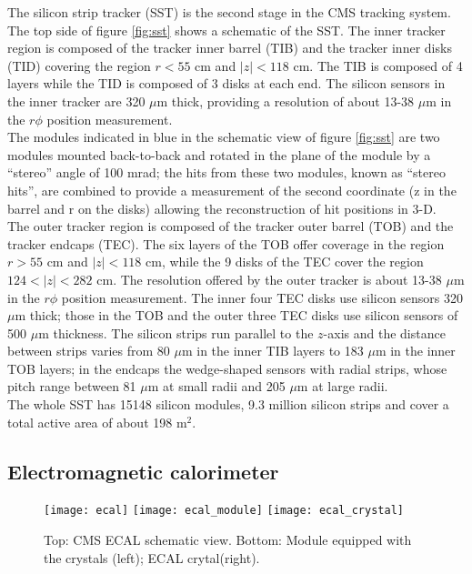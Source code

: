 \noindent The silicon strip tracker (SST) is the second stage in the CMS tracking system. The top side of figure \ref{fig:sst} shows a schematic of the SST. The inner tracker region is composed of the tracker inner barrel (TIB) and the tracker inner disks (TID) covering the region $r<55$ cm and $|z|<118$ cm. The TIB is composed of 4 layers while the TID is composed of 3 disks at each end. The silicon sensors in the inner tracker are 320 $\mu$m thick, providing a resolution of about 13-38 $\mu$m in the $r\phi$ position measurement. \\

\noindent The modules indicated in blue in the schematic view of figure \ref{fig:sst} are two modules mounted back-to-back and rotated in the plane of the module by a ``stereo'' angle of 100 mrad; the hits from these two modules, known as ``stereo hits'', are combined to provide a measurement of the second coordinate (z in the barrel and r on the disks) allowing the reconstruction of hit positions in 3-D.\\ 

\noindent The outer tracker region is composed of the tracker outer barrel (TOB) and the tracker endcaps (TEC). The six layers of the TOB offer coverage in the region $r>55$ cm and $|z|<118$ cm, while the 9 disks of the TEC cover the region $124<|z|<282$ cm. The resolution offered by the outer tracker is about 13-38 $\mu$m in the $r\phi$ position measurement. The inner four TEC disks use silicon sensors 320 $\mu$m thick; those in the TOB and the outer three TEC disks use silicon sensors of 500 $\mu$m thickness. The silicon strips run parallel to the $z$-axis and the distance between strips varies from 80 $\mu$m in the inner TIB layers to 183 $\mu$m in the inner TOB layers; in the endcaps the wedge-shaped sensors with radial strips, whose pitch range between 81 $\mu$m at small radii and 205 $\mu$m at large radii.\\ 

\noindent The whole SST has 15148 silicon modules, 9.3 million silicon strips and cover a total active area of about 198 m$^2$. 

\subsection{Electromagnetic calorimeter}
\begin{figure}[h!]
  \centering
  \texttt{[image: ecal]}
  \texttt{[image: ecal\_module]}
  \texttt{[image: ecal\_crystal]} 
  \caption[CMS ECAL schematic view]{Top: CMS ECAL schematic view. Bottom: Module equipped with the crystals (left); ECAL crytal(right).}
  \label{fig:ecal}
\end{figure}

